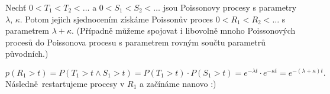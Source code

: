 \documentclass[12pt]{article}					%
\begin{document}
\begin{veta}
	Nechť $0 < T_1 < T_2 < …$ a $0 < S_1 < S_2 < …$ jsou Poissonovy procesy s parametry $\lambda$, $\kappa$. Potom jejich sjednocením získáme Poissonův proces $0 < R_1 < R_2 < …$ s parametrem $\lambda + \kappa$. (Případně můžeme spojovat i libovolně mnoho Poissonových procesů do Poissonova procesu s parametrem rovným součtu parametrů původních.)

	\begin{dukazin}
		$$ p(R_1 > t) = P(T_1 > t \land S_1 > t) = P(T_1 > t)·P(S_1 > t) = e^{-\lambda t}·e^{-\kappa t} = e^{-(\lambda + \kappa) t}. $$
		Následně restartujeme procesy v $R_1$ a začínáme nanovo :)
	\end{dukazin}
\end{veta}
\end{document}
